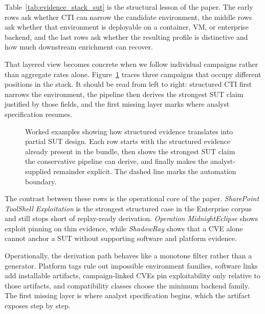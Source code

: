 \documentclass[sigconf]{acmart}
\begin{document}
Table~\ref{tab:evidence_stack_sut} is the structural lesson of the paper. The early rows ask whether CTI can narrow the candidate environment, the middle rows ask whether that environment is deployable on a container, VM, or enterprise backend, and the last rows ask whether the resulting profile is distinctive and how much downstream enrichment can recover.

That layered view becomes concrete when we follow individual campaigns rather than aggregate rates alone. Figure~\ref{fig:worked_examples_sut} traces three campaigns that occupy different positions in the stack. It should be read from left to right: structured CTI first narrows the environment, the pipeline then derives the strongest SUT claim justified by those fields, and the first missing layer marks where analyst specification resumes.

\begin{figure}[!t]
\centering
\resizebox{\textwidth}{!}{}
\caption{Worked examples showing how structured evidence translates into partial SUT design. Each row starts with the structured evidence already present in the bundle, then shows the strongest SUT claim the conservative pipeline can derive, and finally makes the analyst-supplied remainder explicit. The dashed line marks the automation boundary.}\label{fig:worked_examples_sut}
\end{figure}

The contrast between these rows is the operational core of the paper. \emph{SharePoint ToolShell Exploitation} is the strongest structured case in the Enterprise corpus and still stops short of replay-ready derivation. \emph{Operation MidnightEclipse} shows exploit pinning on thin evidence, while \emph{ShadowRay} shows that a CVE alone cannot anchor a SUT without supporting software and platform evidence.

Operationally, the derivation path behaves like a monotone filter rather than a generator. Platform tags rule out impossible environment families, software links add installable artifacts, campaign-linked CVEs pin exploitability only relative to those artifacts, and compatibility classes choose the minimum backend family. The first missing layer is where analyst specification begins, which the artifact exposes step by step.
\end{document}
